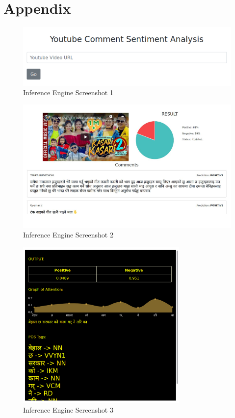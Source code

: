     \appendix                
        \chapter*{Appendix}
        \renewcommand\thefigure{A-\arabic{figure}}    
            \setcounter{figure}{0}    
            \begin{figure}[hbt!]
		    \centering
			    \includegraphics[width=1.0\textwidth]{./img/1.png}
			    \caption{Inference Engine Screenshot 1}
		\end{figure}
		\begin{figure}[hbt!]
		    \centering
			    \includegraphics[width=1.0\textwidth]{./img/2.png}
			    \caption{Inference Engine Screenshot 2}
		\end{figure}
		\begin{figure}[hbt!]
		    \centering
			    \includegraphics[width=0.75\textwidth]{./img/3.png}
			    \caption{Inference Engine Screenshot 3}
		\end{figure}
